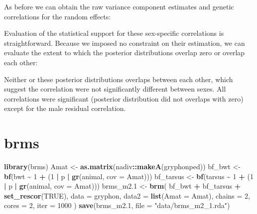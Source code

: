 \documentclass[
  12pt,
]{book}
\newenvironment{Shaded}{\begin{snugshade}}{\end{snugshade}}
\newcommand{\DataTypeTok}[1]{\textcolor[rgb]{0.13,0.29,0.53}{#1}}
\newcommand{\DecValTok}[1]{\textcolor[rgb]{0.00,0.00,0.81}{#1}}
\newcommand{\FloatTok}[1]{\textcolor[rgb]{0.00,0.00,0.81}{#1}}
\newcommand{\KeywordTok}[1]{\textcolor[rgb]{0.13,0.29,0.53}{\textbf{#1}}}
\newcommand{\NormalTok}[1]{#1}
\newcommand{\OperatorTok}[1]{\textcolor[rgb]{0.81,0.36,0.00}{\textbf{#1}}}
\newcommand{\OtherTok}[1]{\textcolor[rgb]{0.56,0.35,0.01}{#1}}
\newcommand{\StringTok}[1]{\textcolor[rgb]{0.31,0.60,0.02}{#1}}
\begin{document}
As before we can obtain the raw variance component estimates and genetic correlations for the random effects:

Evaluation of the statistical support for these sex-specific correlations is straightforward. Because we imposed no constraint on their estimation, we can evaluate the extent to which the posterior distributions overlap zero or overlap each other:

Neither or these posterior distributions overlaps between each other, which suggest the correlation were not significantly different between sexes. All correlations were significant (posterior distribution did not overlaps with zero) except for the male residual correlation.

\hypertarget{brms-2}{%
\section{brms}\label{brms-2}}

\begin{Shaded}
\begin{Highlighting}[]
\KeywordTok{library}\NormalTok{(brms)}
\NormalTok{Amat \textless{}{-}}\StringTok{ }\KeywordTok{as.matrix}\NormalTok{(nadiv}\OperatorTok{::}\KeywordTok{makeA}\NormalTok{(gryphonped))}
\NormalTok{bf\_bwt \textless{}{-}}\StringTok{ }\KeywordTok{bf}\NormalTok{(bwt }\OperatorTok{\textasciitilde{}}\StringTok{ }\DecValTok{1} \OperatorTok{+}\StringTok{ }\NormalTok{(}\DecValTok{1} \OperatorTok{|}\StringTok{ }\NormalTok{p }\OperatorTok{|}\StringTok{ }\KeywordTok{gr}\NormalTok{(animal, }\DataTypeTok{cov =}\NormalTok{ Amat)))}
\NormalTok{bf\_tarsus \textless{}{-}}\StringTok{ }\KeywordTok{bf}\NormalTok{(tarsus }\OperatorTok{\textasciitilde{}}\StringTok{ }\DecValTok{1} \OperatorTok{+}\StringTok{ }\NormalTok{(}\DecValTok{1} \OperatorTok{|}\StringTok{ }\NormalTok{p }\OperatorTok{|}\StringTok{ }\KeywordTok{gr}\NormalTok{(animal, }\DataTypeTok{cov =}\NormalTok{ Amat)))}
\NormalTok{brms\_m2}\FloatTok{.1}\NormalTok{ \textless{}{-}}\StringTok{ }\KeywordTok{brm}\NormalTok{(}
\NormalTok{  bf\_bwt }\OperatorTok{+}\StringTok{ }\NormalTok{bf\_tarsus }\OperatorTok{+}\StringTok{ }\KeywordTok{set\_rescor}\NormalTok{(}\OtherTok{TRUE}\NormalTok{),}
  \DataTypeTok{data =}\NormalTok{ gryphon,}
  \DataTypeTok{data2 =} \KeywordTok{list}\NormalTok{(}\DataTypeTok{Amat =}\NormalTok{ Amat),}
  \DataTypeTok{chains =} \DecValTok{2}\NormalTok{, }\DataTypeTok{cores =} \DecValTok{2}\NormalTok{, }\DataTypeTok{iter =} \DecValTok{1000}
\NormalTok{)}
\KeywordTok{save}\NormalTok{(brms\_m2}\FloatTok{.1}\NormalTok{, }\DataTypeTok{file =} \StringTok{"data/brms\_m2\_1.rda"}\NormalTok{)}
\end{Highlighting}
\end{Shaded}
\end{document}
